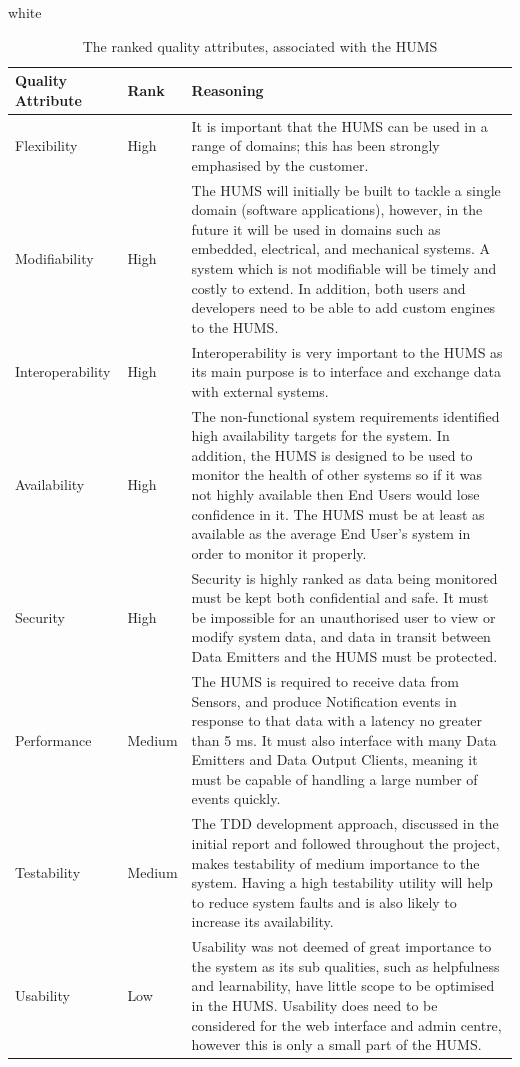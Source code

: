 \documentclass[10pt,a4paper]{article}
\newcommand{\tableformat}[4]{
\begin{table}[H]
\centering
  \rowcolors{2}{gray!10} {white}
\begin{tabular}{#1}
  \hline
  \rowcolor[gray]{0.9} #2
\end{tabular}
\caption{#3}
\label{#4}
\end{table}}
\begin{document}
\tableformat{p{2.4cm} p{1.2cm} p{11.2cm}}{
\hline
Quality \qquad Attribute & Rank & Reasoning \\
\hline
Flexibility & High & It is important that the HUMS can be used in a range of domains; this has been strongly emphasised by the customer. 
\\
Modifiability & High & The HUMS will initially be built to tackle a single domain (software applications), however, in the future it will be used in domains such as embedded, electrical, and mechanical systems. A system which is not modifiable will be timely and costly to extend. In addition, both users and developers need to be able to add custom engines to the HUMS.
\\
Interoperability & High & Interoperability is very important to the HUMS as its main purpose is to interface and exchange data with external systems. 
\\
Availability & High & The non-functional system requirements identified high availability targets for the system. In addition, the HUMS is designed to be used to monitor the health of other systems so if it was not highly available then End Users would lose confidence in it. The HUMS must be at least as available as the average End User's system in order to monitor it properly. 
\\
Security & High & Security is highly ranked as data being monitored must be kept both confidential and safe. It must be impossible for an unauthorised user to view or modify system data, and data in transit between Data Emitters and the HUMS must be protected.
\\
Performance & Medium & The HUMS is required to receive data from Sensors, and produce Notification events in response to that data with a latency no greater than 5 ms. It must also interface with many Data Emitters and Data Output Clients, meaning it must be capable of handling a large number of events quickly.
\\
Testability & Medium & The TDD development approach, discussed in the initial report and followed throughout the project, makes testability of medium importance to the system. Having a high testability utility will help to reduce system faults and is also likely to increase its availability. 
\\
Usability & Low & Usability was not deemed of great importance to the system as its sub qualities, such as helpfulness and learnability, have little scope to be optimised in the HUMS. Usability does need to be considered for the web interface and admin centre, however this is only a small part of the HUMS.
\\
}{The ranked quality attributes, associated with the HUMS}{tab:qualities}
\end{document}
